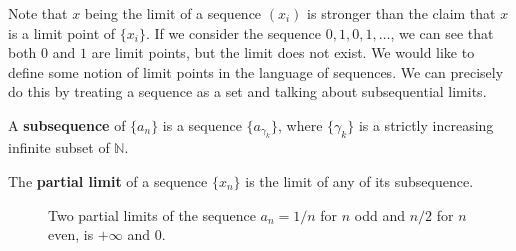   Note that $x$ being the limit of a sequence $(x_i)$ is stronger than the claim that $x$ is a limit point of $\{x_i\}$. If we consider the sequence $0, 1, 0, 1, \ldots$, we can see that both $0$ and $1$ are limit points, but the limit does not exist. We would like to define some notion of limit points in the language of sequences. We can precisely do this by treating a sequence as a set and talking about subsequential limits. 

  \begin{definition}[Subsequences]
    A \textbf{subsequence} of $\{ a_n\}$ is a sequence $\{a_{\gamma_k}\}$, where $\{\gamma_k\}$ is a strictly increasing infinite subset of $\mathbb{N}$. 
  \end{definition}

  \begin{definition}
    The \textbf{partial limit} of a sequence $\{x_n\}$ is the limit of any of its subsequence.  
    \begin{figure}[H]
      \centering 
      \caption{Two partial limits of the sequence $a_n = 1/n$ for $n$ odd and $n/2$ for $n$ even, is $+\infty$ and $0$. } 
      \label{fig:partial_limit}
    \end{figure}
  \end{definition}

